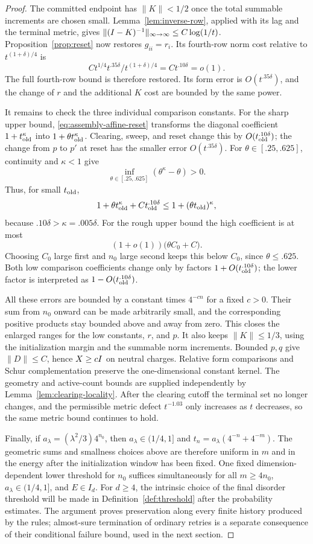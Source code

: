 \begin{proof}
The committed endpoint has $\|K\|<1/2$ once the total summable increments
are chosen small. Lemma~\ref{lem:inverse-row}, applied with its lag and
the terminal metric, gives
$\|(I-K)^{-1}\|_{\infty\to\infty}\le C\log(1/t)$.
Proposition~\ref{prop:reset} now restores $g_{ii}=r_i$.
Its fourth-row norm cost relative to $t^{(1+\delta)/4}$ is
\[
 Ct^{1/4}t^{.35\delta}/t^{(1+\delta)/4}
 =Ct^{.10\delta}=o(1).
\]
The full fourth-row bound is therefore restored. Its form error is
$O(t^{.35\delta})$, and the change of $r$ and the additional $K$ cost
are bounded by the same power.

It remains to check the three individual comparison constants.
For the sharp upper bound, \eqref{eq:assembly-affine-reset} transforms
the diagonal coefficient $1+t_{\rm old}^{\kappa}$ into
$1+\theta t_{\rm old}^{\kappa}$. Clearing, sweep, and reset change this
by $O(t_{\rm old}^{.10\delta})$; the change from $p$ to $p'$ at reset
has the smaller error $O(t^{.35\delta})$.
For $\theta\in[.25,.625]$, continuity and $\kappa<1$ give
\[
 \inf_{\theta\in[.25,.625]}(\theta^\kappa-\theta)>0.
\]
Thus, for small $t_{\rm old}$,
\[
 1+\theta t_{\rm old}^{\kappa}
       +Ct_{\rm old}^{.10\delta}
 \le 1+(\theta t_{\rm old})^\kappa,
\]
because $.10\delta>\kappa=.005\delta$.
For the rough upper bound the high coefficient is at most
\[
 (1+o(1))\bigl(\theta C_0+C\bigr).
\]
Choosing $C_0$ large first and $n_0$ large second keeps this below $C_0$,
since $\theta\le.625$. Both low comparison coefficients change only by
factors $1+O(t_{\rm old}^{.10\delta})$; the lower factor is interpreted
as $1-O(t_{\rm old}^{.10\delta})$.

All these errors are bounded by a constant times $4^{-c n}$ for a
fixed $c>0$. Their sum from $n_0$ onward can be made arbitrarily small,
and the corresponding positive products stay bounded above and away
from zero. This closes the enlarged ranges for the low constants,
$r$, and $p$. It also keeps $\|K\|\le1/3$, using the initialization
margin and the summable norm increments. Bounded $p,q$ give
$\|D\|\le C$, hence $X\ge cI$ on neutral charges. Relative form
comparisons and Schur complementation preserve the one-dimensional
constant kernel. The geometry and active-count bounds are supplied
independently by Lemma~\ref{lem:clearing-locality}.
After the clearing cutoff the terminal set no longer changes, and
the permissible metric defect $t^{-1.03}$ only increases as $t$
decreases, so the same metric bound continues to hold.

Finally, if $a_\lambda=(\lambda^2/3)4^{n_0}$, then
$a_\lambda\in(1/4,1]$ and
$t_n=a_\lambda(4^{-n}+4^{-m})$.
The geometric sums and smallness choices above are therefore uniform in
$m$ and in the energy after the initialization window has been fixed.
One fixed dimension-dependent lower threshold for $n_0$ suffices
simultaneously for all $m\ge4n_0$, $a_\lambda\in(1/4,1]$, and $E\in I_d$.
For $d\ge4$, the intrinsic choice of the final disorder threshold will be made in
Definition~\ref{def:threshold} after the probability estimates.
The argument proves preservation along every finite history produced by the rules;
almost-sure termination of ordinary retries is a separate consequence
of their conditional failure bound, used in the next section.
\end{proof}
